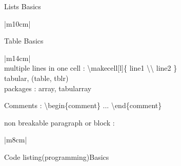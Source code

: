 \begin{enumerate}

     \item Lists Basics

          \begin{myTableStyle} \begin{tabular}{ |m{10cm}| } \hline
                \\ \hline
          \end{tabular} \end{myTableStyle} \vspace{0.08in}

     \item Table Basics

          \begin{myTableStyle} \begin{tabular}{ |m{14cm}| } \hline
                \\ \hline
               multiple lines in one cell : \textbackslash makecell[l]\{ line1 \textbackslash \textbackslash \; line2 \}  \\ \hline
               tabular, (table, tblr) \\ \hline
               packages : array, tabularray            \\ \hline
          \end{tabular} \end{myTableStyle} \vspace{0.08in}

     \item Comments  :  \textbackslash begin\{comment\}      ...   \textbackslash end\{comment\}

     \item non breakable paragraph or block :

          \begin{myTableStyle} \begin{tabular}{ |m{8cm}| } \hline
               \\ \hline
          \end{tabular} \end{myTableStyle} \vspace{0.08in}


     \begin{minipage}{\linewidth}
     \item Code listing(programming)Basics \\
          \begin{myTableStyle} \begin{tabular}{ |m{14cm}| } \hline
                \\ \hline
          \end{tabular} \end{myTableStyle}
     \end{minipage}


\end{enumerate}
